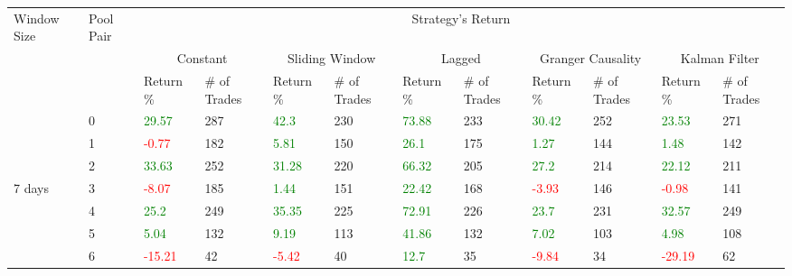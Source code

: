 \begin{table}[!htb]
    \centering
    \begin{adjustwidth}{-0.8in}{-0.9in}
        \begin{tabular}{|p{4em}|p{2em}|p{3em}|p{3em}|p{3em}|p{3em}|p{3em}|p{3em}|p{3em}|p{3em}|p{3em}|p{3em}|}\hline
            Window Size & Pool Pair & \multicolumn{10}{|c|}{Strategy's Return} \\\cline{3-12}
            &   & \multicolumn{2}{|c|}{Constant} & \multicolumn{2}{|c|}{Sliding Window} & \multicolumn{2}{|c|}{Lagged} & \multicolumn{2}{|c|}{Granger Causality} & \multicolumn{2}{|c|}{Kalman Filter}\\\cline{3-12}
            & & Return \% & \# of Trades & Return \% & \# of Trades & Return \% & \# of Trades & Return \% & \# of Trades & Return \% & \# of Trades\\\hline

            & 0 & \textcolor{green}{29.57} & 287 & \textcolor{green}{42.3} & 230 & \textcolor{green}{73.88} & 233 & \textcolor{green}{30.42} & 252 & \textcolor{green}{23.53} & 271\\\cline{3-12}
            & 1 & \textcolor{red}{-0.77} & 182 & \textcolor{green}{5.81} & 150 & \textcolor{green}{26.1} & 175 & \textcolor{green}{1.27} & 144 & \textcolor{green}{1.48} & 142\\\cline{3-12}
            & 2 & \textcolor{green}{33.63} & 252 & \textcolor{green}{31.28} & 220 & \textcolor{green}{66.32} & 205 & \textcolor{green}{27.2} & 214 & \textcolor{green}{22.12} & 211\\\cline{3-12}
            7 days & 3 & \textcolor{red}{-8.07} & 185 & \textcolor{green}{1.44} & 151 & \textcolor{green}{22.42} & 168 & \textcolor{red}{-3.93} & 146 & \textcolor{red}{-0.98} & 141\\\cline{3-12}
            & 4 & \textcolor{green}{25.2} & 249 & \textcolor{green}{35.35} & 225 & \textcolor{green}{72.91} & 226 & \textcolor{green}{23.7} & 231 & \textcolor{green}{32.57} & 249\\\cline{3-12}
            & 5 & \textcolor{green}{5.04} & 132 & \textcolor{green}{9.19} & 113 & \textcolor{green}{41.86} & 132 & \textcolor{green}{7.02} & 103 & \textcolor{green}{4.98} & 108\\\cline{3-12}
            & 6 & \textcolor{red}{-15.21} & 42 & \textcolor{red}{-5.42} & 40 & \textcolor{green}{12.7} & 35 & \textcolor{red}{-9.84} & 34 & \textcolor{red}{-29.19} & 62\\\hline\hline


\end{tabular}
\end{adjustwidth}
\end{table}
